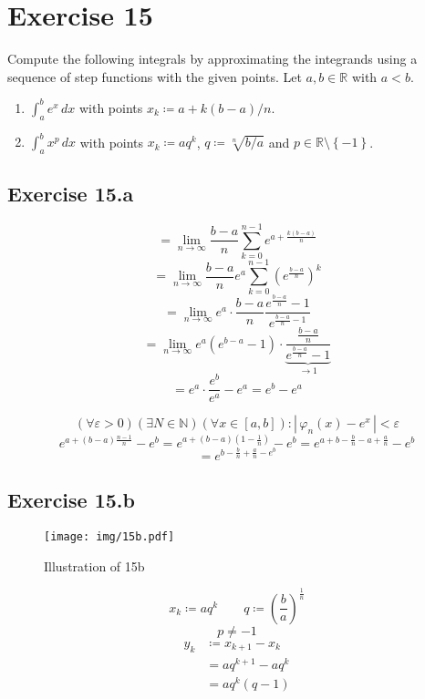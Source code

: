 \documentclass[a4paper]{article}
\theoremstyle{definition}
\newcommand\abs[1]{\left|\,#1\,\right|}
\newcommand\set[1]{\left\{#1\right\}}
\begin{document}
\section{Exercise 15}
\begin{ex}
  Compute the following integrals by approximating the integrands using a sequence
  of step functions with the given points. Let $a,b \in \mathbb R$ with $a < b$.
  \begin{enumerate}
    \item $\int_a^b e^x \, dx$ with points $x_k \coloneqq a + k(b - a)/n$.
    \item $\int_a^b x^p \, dx$ with points $x_k \coloneqq a q^k$, $q \coloneqq \sqrt[n]{b/a}$ and $p \in \mathbb R \setminus \set{-1}$.
  \end{enumerate}
\end{ex}

\subsection{Exercise 15.a}
%
\[ = \lim_{n \to \infty} \frac{b-a}{n} \sum_{k=0}^{n-1} e^{a + \frac{k(b-a)}{n}} \]
\[ = \lim_{n \to \infty} \frac{b-a}{n} e^a \sum_{k=0}^{n-1} \left(e^{\frac{b - a}{n}}\right)^k \]
\[ = \lim_{n \to \infty} e^a \cdot \frac{b - a}{n} \frac{e^{\frac{b - a}{n}} - 1}{e^{\frac{b - a}{n} - 1}} \]
\[ = \lim_{n \to \infty} e^a \left(e^{b - a} - 1\right) \cdot \underbrace{\frac{\frac{b - a}{n}}{e^{\frac{b - a}{n}} - 1}}_{\to 1} \]
\[ = e^a \cdot \frac{e^b}{e^a} - e^a = e^b - e^a \]

\[ (\forall \varepsilon > 0) (\exists N \in \mathbb N) (\forall x \in [a,b]): \abs{\varphi_n(x)  - e^x} < \varepsilon \]
\[ e^{a + (b-a)\frac{n-1}{n}} - e^b = e^{a + (b-a)(1 - \frac1n)} - e^b = e^{a + b - \frac{b}{n} - a + \frac{a}{n}} - e^b \]
\[ = e^{b - \frac{b}{n} + \frac{a}{n} - e^b} \]

\subsection{Exercise 15.b}
%
\begin{figure}[t]
  \begin{center}
    \texttt{[image: img/15b.pdf]}
    \caption{Illustration of 15b}
  \end{center}
\end{figure}

\[ x_k \coloneqq aq^k \qquad q \coloneqq \left(\frac{b}{a}\right)^{\frac1n} \]
\[ p \neq -1 \]
\begin{align*}
  y_k &\coloneqq x_{k+1} - x_k \\
    &= aq^{k+1} - aq^{k} \\
    &= aq^k (q - 1)
\end{align*}
\end{document}
